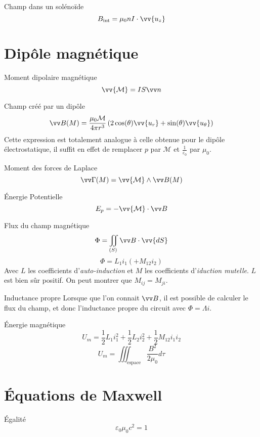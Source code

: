 \documentclass[french, a4paper, 11pt, twocolumn]{article}
\newcommand{\inv}[1]{\dfrac{1}{#1}}
\newcommand{\po}{\left(}         %
\newcommand{\pf}{\right)}        %
\newcommand{\pof}[1]{\po #1 \pf} %
\newcommand{\vect}[1]{\vv{#1}}
\newcommand{\uz}{\vect{u_z}}          %
\newcommand{\ur}{\vect{u_r}}          %
\newcommand{\uth}{\vect{u_\theta}}    %
\begin{document}
\begin{cadre}{Champ dans un solénoïde}
  \[B_{\text{int}}=\mu_{0}nI\cdot\uz\]
\end{cadre}

\section{Dipôle magnétique}
\begin{cadre}{Moment dipolaire magnétique}
  \[\vv{\mathcal M} = IS\vv n\]
\end{cadre}

\begin{cadre}{Champ créé par un dipôle}
  \[\vv B(M) = \dfrac{\mu_0\mathcal M}{4\pi r^3}\pof{2\cos(\theta)\ur + \sin(\theta)\uth}\]
  Cette expression est totalement analogue à celle obtenue pour le dipôle électrostatique, il suffit en effet de remplacer $p$ par $\mathcal M$ et $\frac{1}{\varepsilon_{0}}$ par $\mu_{0}$.
\end{cadre}

\begin{cadre}{Moment des forces de Laplace}
\[\vv\Gamma(M) = \vv{\mathcal M}\wedge \vv B(M)\]
\end{cadre}

\begin{cadre}{Énergie Potentielle}
  \[E_{p} = -\vv{\mathcal M}\cdot \vv B\]
\end{cadre}

\begin{cadre}{Flux du champ magnétique}
  \[\Phi = \iint_{(S)}\vv B\cdot\vv{dS}\]
  \[\Phi = L_{1}i_{1} (+ M_{12} i_{2})\]
  Avec $L$ les coefficients d'\emph{auto-induction} et $M$ les coefficients d'\emph{iduction mutelle}.
  $L$ est bien sûr positif.
  On peut montrer que $M_{ij} = M_{ji}$.
\end{cadre}

\begin{cadre}{Inductance propre}
  Lorsque que l'on connait $\vv B$, il est possible de calculer le flux du champ, et donc l'inductance propre du circuit avec $\Phi =\Lambda i$.
\end{cadre}

\begin{cadre}{Énergie magnétique}
  \[U_{m} = \inv{2}L_{1}i_{1}^{2}+\inv{2}L_{2}i_{2}^{2}+\inv{2}M_{12}i_{1}i_{2}\]
  \[U_{m} = \iiint_{\text{espace}}\dfrac{B^{2}}{2\mu_{0}}d\tau\]
\end{cadre}

\section{Équations de Maxwell}
\begin{cadre}{Égalité}
  \[\varepsilon_{0}\mu_{0}c^{2}=1\]
\end{cadre}
\end{document}
